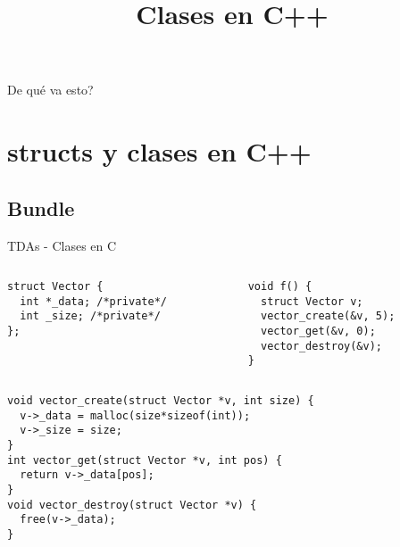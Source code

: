 


\title%
{Clases en C++}

\subject{Clases en C++}



\begin{frame}
   \titlepage
\end{frame}

\begin{frame}{De qu\'e va esto?}
   \tableofcontents
\end{frame}

\section{structs y clases en C++}
\subsection{Bundle}
\begin{frame}{TDAs - Clases en C}{}
   \begin{columns}[t]
      \begin{column}{.4\linewidth}
         \begin{lstlisting}[style=normal,firstnumber=1]
struct Vector {
  int *_data; /*private*/
  int _size; /*private*/
};


         \end{lstlisting}
      \end{column}
      \begin{column}{.4\linewidth}
         \begin{lstlisting}[style=normal,firstnumber=15]
void f() {
  struct Vector v;
  vector_create(&v, 5);
  vector_get(&v, 0);
  vector_destroy(&v);
}
         \end{lstlisting}
      \end{column}
   \end{columns}

   \begin{columns}[t]
      \begin{column}{.4\linewidth}
        \begin{lstlisting}[style=normal,firstnumber=5]
void vector_create(struct Vector *v, int size) {
  v->_data = malloc(size*sizeof(int));
  v->_size = size;
}
int vector_get(struct Vector *v, int pos) {
  return v->_data[pos];
}
void vector_destroy(struct Vector *v) {
  free(v->_data);
}

        \end{lstlisting}
      \end{column}
      \begin{column}{.4\linewidth}
      \end{column}
   \end{columns}
\end{frame}
